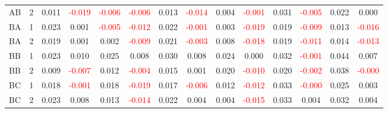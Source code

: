 \begin{table}[!htb]
{\begin{tabular}{llcccccccccccc}
AB & 2 & 0.011 & \textcolor{red}{-0.019} & \textcolor{red}{-0.006} & \textcolor{red}{-0.006} & 0.013 & \textcolor{red}{-0.014} & 0.004 & \textcolor{red}{-0.001} & 0.031 & \textcolor{red}{-0.005} & 0.022 & 0.000\\
BA & 1 & 0.023 & 0.001 & \textcolor{red}{-0.005} & \textcolor{red}{-0.012} & 0.022 & \textcolor{red}{-0.001} & 0.003 & \textcolor{red}{-0.019} & 0.019 & \textcolor{red}{-0.009} & 0.013 & \textcolor{red}{-0.016}\\
BA & 2 & 0.019 & 0.001 & 0.002 & \textcolor{red}{-0.009} & 0.021 & \textcolor{red}{-0.003} & 0.008 & \textcolor{red}{-0.018} & 0.019 & \textcolor{red}{-0.011} & 0.014 & \textcolor{red}{-0.013}\\
BB & 1 & 0.023 & 0.010 & 0.025 & 0.008 & 0.030 & 0.008 & 0.024 & 0.000 & 0.032 & \textcolor{red}{-0.001} & 0.044 & 0.007\\
BB & 2 & 0.009 & \textcolor{red}{-0.007} & 0.012 & \textcolor{red}{-0.004} & 0.015 & 0.001 & 0.020 & \textcolor{red}{-0.010} & 0.020 & \textcolor{red}{-0.002} & 0.038 & \textcolor{red}{-0.000}\\
BC & 1 & 0.018 & \textcolor{red}{-0.001} & 0.018 & \textcolor{red}{-0.019} & 0.017 & \textcolor{red}{-0.006} & 0.012 & \textcolor{red}{-0.012} & 0.033 & \textcolor{red}{-0.000} & 0.025 & 0.003\\
BC & 2 & 0.023 & 0.008 & 0.013 & \textcolor{red}{-0.014} & 0.022 & 0.004 & 0.004 & \textcolor{red}{-0.015} & 0.033 & 0.004 & 0.032 & 0.004\\
\hline
    \end{tabular}%
    }
\end{table}


